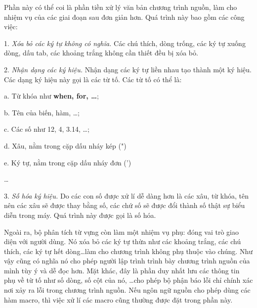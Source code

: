 
\vspace{1cm}


Phần này có thể coi là phần tiền xử lý văn bản chương trình nguồn, làm cho nhiệm vụ của các giai đoạn sau đơn giản hơn. Quá trình này bao gồm các công việc:

1. {\itshape Xóa bỏ các ký tự không có nghĩa.} Các chú thích, dòng trống, các ký tự xuống dòng, dấu tab, các khoảng trắng không cần thiết đều bị xóa bỏ.

2. {\itshape Nhận dạng các ký hiệu.} Nhận dạng các ký tự liền nhau tạo thành một ký hiệu. Các dạng ký hiệu này gọi là các từ tố. Các từ tố có thể là:

a. Từ khóa như \textbf{when, for, \dots};

b. Tên của biến, hàm, \dots;

c. Các số như 12, 4, 3.14, \dots;

d. Xâu, nằm trong cặp dấu nháy kép (")

e. Ký tự, nằm trong cặp dấu nháy đơn (')

\dots

3. {\itshape Số hóa ký hiệu.} Do các con số được xử lí dễ dàng hơn là các xâu, từ khóa, tên nên các xâu sẽ được thay bằng số, các chứ số sẽ được đổi thành số thật sự biểu diễn trong máy. Quá trình này được gọi là số hóa.

Ngoài ra, bộ phân tích từ vựng còn làm một nhiệm vụ phụ: đóng vai trò giao diện với người dùng. Nó xóa bỏ các ký tự thừa như các khoảng trắng, các chú thích, các ký tự hết dòng\dots\space làm cho chương trình không phụ thuộc vào chúng. Như vậy cũng có nghĩa nó cho phép người lập trình trình bày chương trình nguồn của mình tùy ý và dễ đọc hơn. Mặt khác, đây là phần duy nhất lưu các thông tin phụ về từ tố như số dòng, số cột của nó, \dots\space cho phép bộ phận báo lỗi chỉ chính xác nơi xảy ra lỗi trong chương trình nguồn. Nếu ngôn ngữ nguồn cho phép dùng các hàm macro, thì việc xử lí các macro cũng thường được đặt trong phần này.

